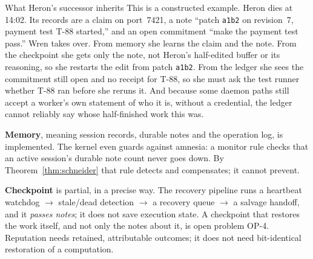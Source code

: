 \documentclass[11pt,a4paper]{article}
\theoremstyle{definition}
\theoremstyle{remark}
\begin{document}

\begin{pdexample}{What Heron's successor inherits}
This is a constructed example. Heron dies at 14:02. Its records are a claim on
port~7421, a note ``patch \texttt{a1b2} on revision~7, payment test T-88
started,'' and an open commitment ``make the payment test pass.'' Wren takes
over. From memory she learns the claim and the note. From the checkpoint she
gets only the note, not Heron's half-edited buffer or its reasoning, so she
restarts the edit from patch \texttt{a1b2}. From the ledger she sees the
commitment still open and no receipt for T-88, so she must ask the test runner
whether T-88 ran before she reruns it. And because some daemon paths still
accept a worker's own statement of who it is, without a credential, the ledger
cannot reliably say whose half-finished work this was.
\end{pdexample}

\textbf{Memory}, meaning session records, durable notes and the operation log,
is implemented. The kernel even guards against amnesia: a monitor rule checks
that an active session's durable note count never goes down. By
Theorem~\ref{thm:schneider} that rule detects and compensates; it cannot
prevent.

\ifpdmargincolumn\pdheartbeatsketch\fi
\textbf{Checkpoint} is partial, in a precise way. The recovery pipeline runs a
heartbeat watchdog $\to$ stale/dead detection $\to$ a recovery queue $\to$ a
salvage handoff, and it \emph{passes notes}; it does not save execution state.
A checkpoint that restores the work itself, and not only the notes about it, is
open problem OP-4. Reputation needs retained, attributable outcomes; it does not
need bit-identical restoration of a computation.
\end{document}
